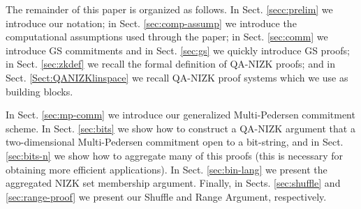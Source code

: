 The remainder of this paper is organized as follows. In Sect. \ref{secc:prelim} we introduce our notation; in Sect. \ref{sec:comp-assump} we introduce the computational assumptions used through the paper; in Sect. \ref{sec:comm} we introduce GS commitments and in Sect. \ref{sec:gs} we quickly introduce GS proofs; in Sect. \ref{sec:zkdef} we recall the formal definition of QA-NIZK proofs; and in Sect. \ref{Sect:QANIZKlinspace} we recall QA-NIZK proof systems which we use as building blocks.

In Sect. \ref{sec:mp-comm} we introduce our generalized Multi-Pedersen commitment scheme.
In Sect. \ref{sec:bits} we show how to construct a QA-NIZK argument that a two-dimensional Multi-Pedersen commitment open to a bit-string, and in Sect. \ref{sec:bits-n} we show how to aggregate many of this proofs (this is necessary for obtaining more efficient applications).
In Sect. \ref{sec:bin-lang} we present the aggregated NIZK set membership argument. Finally, in Sects. \ref{sec:shuffle} and \ref{sec:range-proof} we present our Shuffle and Range Argument, respectively.
